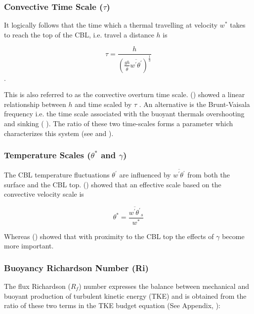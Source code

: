 \subsubsection{Convective Time Scale ($\tau$)}
\label{subsubsec:}

It logically follows that the time which a thermal travelling at velocity $w^{*}$ takes to reach the top of the \acs{CBL}, i.e. travel a distance $h$ is

\begin{equation}
\tau = \frac{h}{\left( \frac{gh}{\overline{\theta}}\overline{w^{'}\theta^{'}} \right)^{\frac{1}{3}}}
\end{equation}.

 This is also referred to as the convective overturn time scale.  \citeauthor{SullMoengStev} (\citeyear{SullMoengStev}) 
showed a linear relationship between $h$ and time scaled by $\tau$ . An alternative is the Brunt-Vaisala frequency i.e. the time scale
 associated with the buoyant thermals overshooting and sinking (\citeauthor{FedConzMir04} \cite{FedConzMir04}).  The ratio of these two time-scales forms a parameter which characterizes this system (see \citeauthor{Sorbjan}\citeyear{Sorbjan} and \citeauthor{Deardorff79} \citeyear{Deardorff79}). 

\subsubsection{Temperature Scales ($\theta^{*}$ and $\gamma$)}
\label{subsubsec:}

The \acs{CBL} temperature fluctuations $\theta^{'}$ are influenced by $\overline{w^{'}\theta^{'}}$ from both the surface and the \acs{CBL} top.
\citeauthor {Deardorff70} (\citeyear{Deardorff70}) showed that an effective scale based on the convective velocity scale is

\begin{equation}
\theta^{*} = \frac{\overline{w^{'}\theta^{'}}_{s}}{w^{*}}
\end{equation} 

Whereas \citeauthor{Sorbjan} (\citeyear{Sorbjan}) showed that with proximity to the \acs{CBL} top the effects of $\gamma$ become more important.
 
\subsubsection{Buoyancy Richardson Number (\acs{Ri})}
\label{subsubsec:}

The flux Richardson ($R_{f}$) number expresses the balance between mechanical and buoyant production of turbulent kinetic energy (\acs{TKE}) and is obtained from the ratio of these two terms in the \acs{TKE} budget equation (See Appendix, \citeauthor{Stull-BLMetIntro} \citeyear{Stull-BLMetIntro}):

